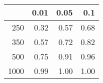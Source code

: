 % 
\begin{tabular}{rrrr}
  \hline
 & 0.01 & 0.05 & 0.1 \\ 
  \hline
250 & 0.32 & 0.57 & 0.68 \\ 
  350 & 0.57 & 0.72 & 0.82 \\ 
  500 & 0.75 & 0.91 & 0.96 \\ 
  1000 & 0.99 & 1.00 & 1.00 \\ 
   \hline
\end{tabular}
